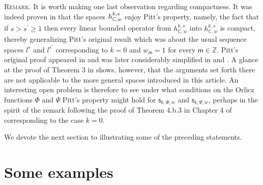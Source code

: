 \documentclass{article}
\begin{document}
\bigskip

\textsc{Remark.} It is worth making one last observation regarding
compactness. It was indeed proven in \cite{vuillermot} that the spaces $h_{%
\mathbb{C},w}^{k,s}$ enjoy Pitt's property, namely, the fact that if $%
s>s^{\prime }\geq 1$ then every linear bounded operator from $h_{\mathbb{C}%
,w}^{k,s}$ into $h_{\mathbb{C},w}^{k,s^{\prime }}$ is compact, thereby
generalizing Pitt's original result which was about the usual sequence
spaces $l^{s}$ and $l^{s^{\prime }}$ corresponding to $k=0$ and $w_{\mathsf{m%
}}=1$ for every $\mathsf{m}\in \mathbb{Z}$. Pitt's original proof appeared
in \cite{pitt} and was later considerably simplified in \cite{delpech} and 
\cite{fabianzizler}. A glance at the proof of Theorem 3 in \cite{vuillermot}
shows, however, that the arguments set forth there are not applicable to the
more general spaces introduced in this article. An interesting open problem
is therefore to see under what conditions on the Orlicz functions $\Phi $
and $\Psi $ Pitt's property might hold for $\mathsf{s}_{k,\Phi ,w}$ and $%
\mathsf{s}_{k,\Psi ,w}$, perhaps in the spirit of the remark following the
proof of Theorem 4.b.3 in Chapter 4 of \cite{lindenstrausstra} corresponding
to the case $k=0$.

\bigskip

We devote the next section to illustrating some of the preceding statements.

\section{Some examples}
\end{document}
